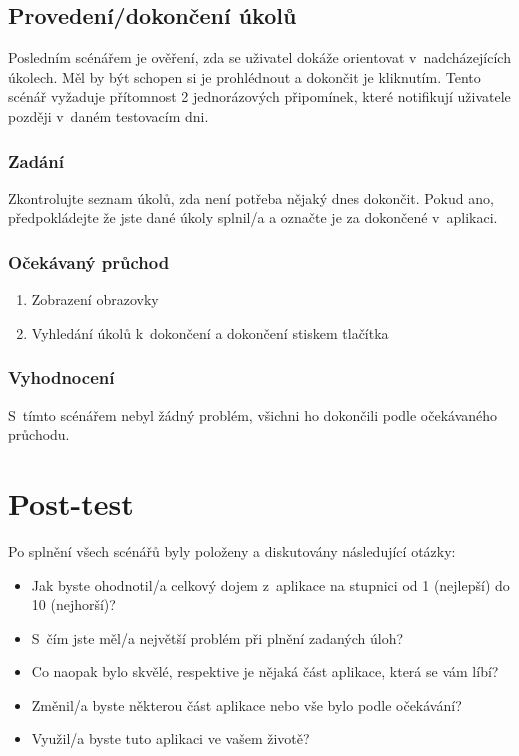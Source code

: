 \documentclass[thesis=M,czech]{FITthesis}[2019/12/23]
\begin{document}
\subsection{Provedení/dokončení úkolů}
Posledním scénářem je ověření, zda se uživatel dokáže orientovat v~nadcházejících úkolech. Měl by být schopen si je prohlédnout a dokončit je kliknutím. Tento scénář vyžaduje přítomnost 2 jednorázových připomínek, které notifikují uživatele později v~daném testovacím dni.
\subsubsection*{Zadání}
Zkontrolujte seznam úkolů, zda není potřeba nějaký dnes dokončit. Pokud ano, předpokládejte že jste dané úkoly splnil/a a označte je za dokončené v~aplikaci.
\subsubsection*{Očekávaný průchod}
\begin{enumerate}
    \item Zobrazení obrazovky 
    \item Vyhledání úkolů k~dokončení a dokončení stiskem tlačítka 
\end{enumerate}
\subsubsection*{Vyhodnocení}
S~tímto scénářem nebyl žádný problém, všichni ho dokončili podle očekávaného průchodu.

\section{Post-test}
Po splnění všech scénářů byly položeny a diskutovány následující otázky:

\begin{itemize}
    \item Jak byste ohodnotil/a celkový dojem z~aplikace na stupnici od 1 (nejlepší) do 10 (nejhorší)?
    \item S~čím jste měl/a největší problém při plnění zadaných úloh?
    \item Co naopak bylo skvělé, respektive je nějaká část aplikace, která se vám líbí?
    \item Změnil/a byste některou část aplikace nebo vše bylo podle očekávání?
    \item Využil/a byste tuto aplikaci ve vašem životě?
\end{itemize}
\end{document}
